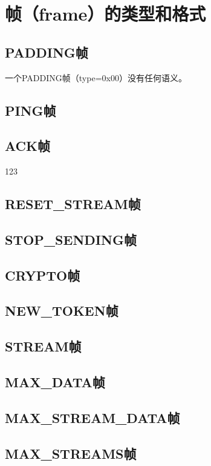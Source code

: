\section{帧（frame）的类型和格式}
\subsection{PADDING帧}
\label{subsec:padding-frames}
一个PADDING帧（type=0x00）没有任何语义。
\subsection{PING帧}

\subsection{ACK帧}
123
\subsection{RESET\_STREAM帧}
\subsection{{STOP\_SENDING}帧}

\subsection{CRYPTO帧}
\label{subsec:crypto-frames}

\subsection{NEW\_TOKEN帧}

\subsection{STREAM帧}

\subsection{MAX\_DATA帧}

\subsection{MAX\_STREAM\_DATA帧}

\subsection{MAX\_STREAMS帧}

